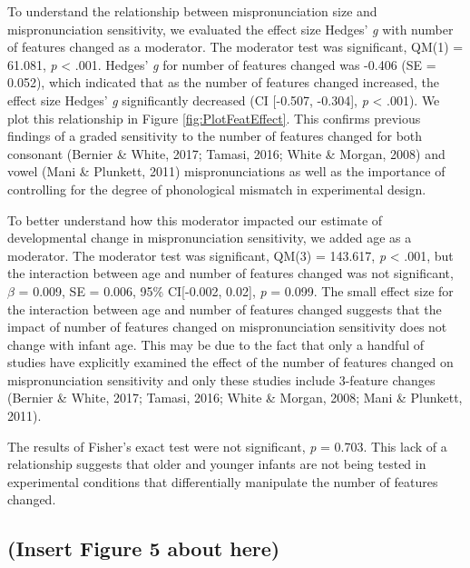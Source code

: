 \documentclass[man]{apa6}
\theoremstyle{definition}
\theoremstyle{definition}
\theoremstyle{definition}
\theoremstyle{remark}
\begin{document}
To understand the relationship between mispronunciation size and
mispronunciation sensitivity, we evaluated the effect size Hedges'
\emph{g} with number of features changed as a moderator. The moderator
test was significant, QM(1) = 61.081, \emph{p} \textless{} .001. Hedges'
\emph{g} for number of features changed was -0.406 (SE = 0.052), which
indicated that as the number of features changed increased, the effect
size Hedges' \emph{g} significantly decreased (CI {[}-0.507, -0.304{]},
\emph{p} \textless{} .001). We plot this relationship in Figure
\ref{fig:PlotFeatEffect}. This confirms previous findings of a graded
sensitivity to the number of features changed for both consonant
(Bernier \& White, 2017; Tamasi, 2016; White \& Morgan, 2008) and vowel
(Mani \& Plunkett, 2011) mispronunciations as well as the importance of
controlling for the degree of phonological mismatch in experimental
design.

To better understand how this moderator impacted our estimate of
developmental change in mispronunciation sensitivity, we added age as a
moderator. The moderator test was significant, QM(3) = 143.617, \emph{p}
\textless{} .001, but the interaction between age and number of features
changed was not significant, \(\beta\) = 0.009, SE = 0.006, 95\%
CI{[}-0.002, 0.02{]}, \emph{p} = 0.099. The small effect size for the
interaction between age and number of features changed suggests that the
impact of number of features changed on mispronunciation sensitivity
does not change with infant age. This may be due to the fact that only a
handful of studies have explicitly examined the effect of the number of
features changed on mispronunciation sensitivity and only these studies
include 3-feature changes (Bernier \& White, 2017; Tamasi, 2016; White
\& Morgan, 2008; Mani \& Plunkett, 2011).

The results of Fisher's exact test were not significant, \emph{p} =
0.703. This lack of a relationship suggests that older and younger
infants are not being tested in experimental conditions that
differentially manipulate the number of features changed.

\subsection{(Insert Figure 5 about
here)}\label{insert-figure-5-about-here}
\end{document}
